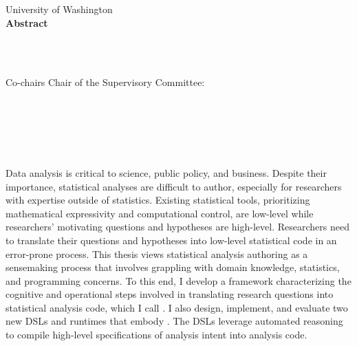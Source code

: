 
\thispagestyle{empty}
\begin{centering}
\vspace{1in}
University of Washington \\
\vspace*{1.\baselineskip}
{\bf Abstract}\\
\vspace*{1\baselineskip}

{\thesisTitle}\\ %
\vspace*{1.\baselineskip}
{\authorName} \\ %
\vspace*{1.\baselineskip}


\ifdefined\secondAdvisor
    Co-chairs
    \else
    Chair
\fi
of the Supervisory Committee:\\ %
\advisorTitle~\advisor\\ \vspace{-.5em} \advisorDepartment \\
\ifdefined\secondAdvisor
    \secondAdvisorTitle~\secondAdvisor\\\vspace{-.5em}\secondAdvisorDepartment \\
\fi
\end{centering}
\vspace*{\baselineskip}

 \\

Data analysis is critical to science, public policy, and business. Despite their
importance, statistical analyses are difficult to author, especially for
researchers with expertise outside of statistics. Existing statistical tools,
prioritizing mathematical expressivity and computational control, are low-level
while researchers' motivating questions and hypotheses are high-level.
Researchers need to translate their questions and hypotheses into low-level
statistical code in an error-prone process. 
This thesis views statistical analysis authoring as a sensemaking process that
involves grappling with domain knowledge, statistics, and programming concerns.
To this end, I develop a framework characterizing the cognitive and operational
steps involved in translating research questions into statistical analysis code,
which I call \hypoForm. I also design, implement, and evaluate two new DSLs and
runtimes that embody \hypoForm. The DSLs leverage automated reasoning to compile
high-level specifications of analysis intent into analysis code.


